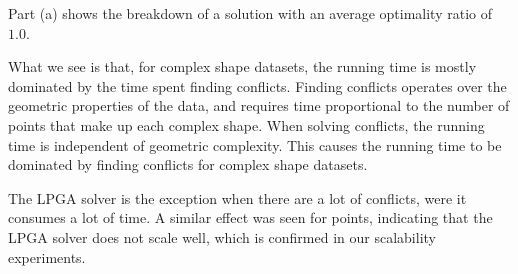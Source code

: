 Part (a) shows the breakdown of a solution with an average optimality ratio of $1.0$.


What we see is that, for complex shape datasets, the running time is mostly dominated by the time spent finding conflicts. Finding conflicts operates over the geometric properties of the data, and requires time proportional to the number of points that make up each complex shape. When solving conflicts, the running time is independent of geometric complexity. This causes the running time to be dominated by finding conflicts for complex shape datasets.

The LPGA solver is the exception when there are a lot of conflicts, were it consumes a lot of time. A similar effect was seen for points, indicating that the LPGA solver does not scale well, which is confirmed in our scalability experiments.

